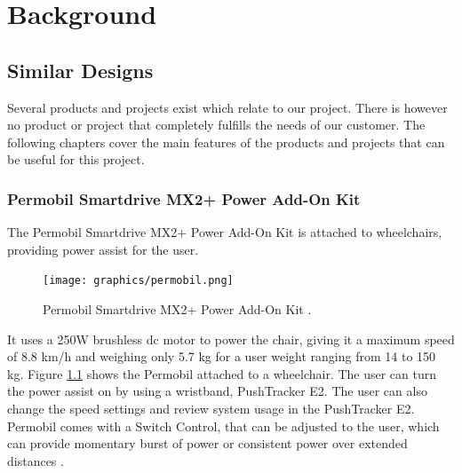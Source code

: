 \chapter{Background\label{cha:background}}


\section{Similar Designs}
Several products and projects exist which relate to our project. 
There is however no product or project that completely fulfills the needs of our customer. 
The following chapters cover the main features of the products and projects that can be useful for this project. 


\subsection{Permobil Smartdrive MX2+ Power Add-On Kit}
The Permobil Smartdrive MX2+ Power Add-On Kit is attached to wheelchairs, providing power assist for the user. 

\begin{figure}[!ht]
    \centering
    \texttt{[image: graphics/permobil.png]}
    \caption{Permobil Smartdrive MX2+ Power Add-On Kit \cite{permobil_smartdrive_2022}.}
    \label{fig:permobil}
\end{figure}

It uses a 250W brushless dc motor to power the chair, giving it a maximum speed of 8.8 km/h and weighing only 5.7 kg for a user weight ranging from 14 to 150 kg.
Figure \ref{fig:permobil} shows the Permobil attached to a wheelchair. 
The user can turn the power assist on by using a wristband, PushTracker E2. 
The user can also change the speed settings and review system usage in the PushTracker E2. 
Permobil comes with a Switch Control, that can be adjusted to the user, which can provide momentary burst of power or  consistent power over extended distances \cite{permobil_smartdrive_2022}. 


